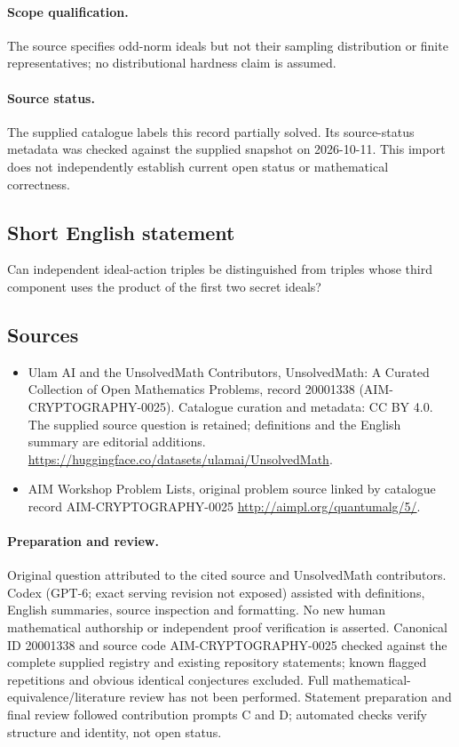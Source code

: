 \documentclass[11pt]{article}
\begin{document}
\paragraph{Scope qualification.}
The source specifies odd-norm ideals but not their sampling distribution or finite representatives; no distributional hardness claim is assumed.
\paragraph{Source status.}
The supplied catalogue labels this record partially solved. Its source-status metadata was checked against the supplied snapshot on 2026-10-11. This import does not independently establish current open status or mathematical correctness.
\subsection{Short English statement}
Can independent ideal-action triples be distinguished from triples whose third component uses the product of the first two secret ideals?
\subsection{Sources}
\begin{itemize}
\item[S1] Ulam AI and the UnsolvedMath Contributors, UnsolvedMath: A Curated Collection of Open Mathematics Problems, record 20001338 (AIM-CRYPTOGRAPHY-0025). Catalogue curation and metadata: CC BY 4.0. The supplied source question is retained; definitions and the English summary are editorial additions.
\url{https://huggingface.co/datasets/ulamai/UnsolvedMath}.
\item[S2] AIM Workshop Problem Lists, original problem source linked by catalogue record AIM-CRYPTOGRAPHY-0025
\url{http://aimpl.org/quantumalg/5/}.
\end{itemize}
\paragraph{Preparation and review.}
Original question attributed to the cited source and UnsolvedMath contributors. Codex (GPT-6; exact serving revision not exposed) assisted with definitions, English summaries, source inspection and formatting. No new human mathematical authorship or independent proof verification is asserted. Canonical ID 20001338 and source code AIM-CRYPTOGRAPHY-0025 checked against the complete supplied registry and existing repository statements; known flagged repetitions and obvious identical conjectures excluded. Full mathematical-equivalence/literature review has not been performed. Statement preparation and final review followed contribution prompts C and D; automated checks verify structure and identity, not open status.
\label{end:20001338}
\end{document}
